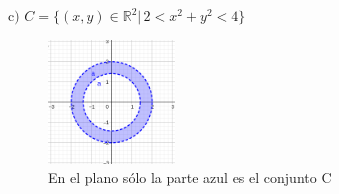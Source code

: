 \documentclass[letterpaper]{article}
\renewcommand{\*}{\cdot}
\theoremstyle{definition}
\begin{document}
%
%
\noindent$\text{c) }C = \{ (x,y) \in \mathbb{R}^2 \vert \, 2 < x^2  + y^2 < 4\}$
\begin{figure}[h]
	\centering
	\includegraphics[width=0.3\textwidth]{1c}
	\caption{En el plano sólo la parte azul es el conjunto C}
\end{figure}
\end{document}

